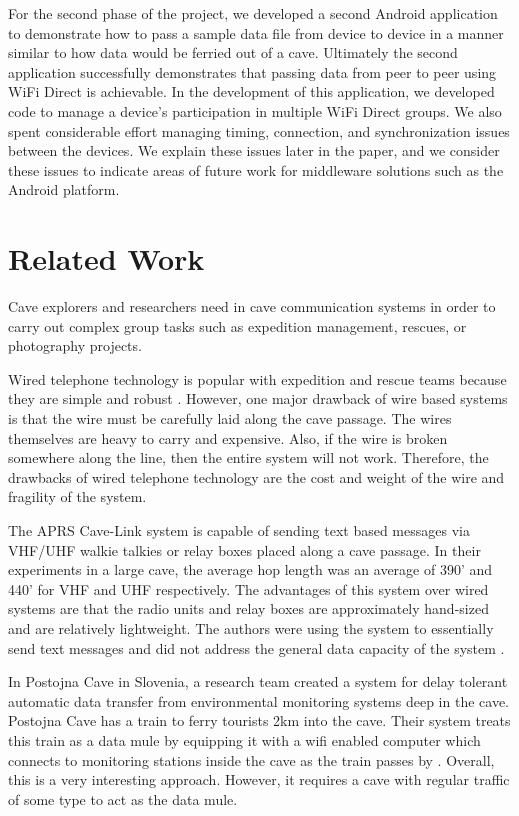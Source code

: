 \documentclass[10pt,twocolumn]{article}
\begin{document}
For the second phase of the project, we developed a second Android application to demonstrate how to pass a sample data file from device to device in a manner similar to how data would be ferried out of a cave.
Ultimately the second application successfully demonstrates that passing data from peer to peer using WiFi Direct is achievable. 
In the development of this application, we developed code to manage a device's participation in multiple WiFi Direct groups.
We also spent considerable effort managing timing, connection, and synchronization issues between the devices.
We explain these issues later in the paper, and we consider these issues to indicate areas of future work for middleware solutions
such as the Android platform.



\section{Related Work}
\label{sec:Related}
Cave explorers and researchers need in cave communication systems in order to carry out complex group tasks such as expedition management, rescues, or photography projects.

Wired telephone technology is popular with expedition and rescue teams because they are simple and robust \cite{cavecomm}.
However, one major drawback of wire based systems is that the wire must be carefully laid along the cave passage. 
The wires themselves are heavy to carry and expensive.
Also, if the wire is broken somewhere along the line, then the entire system will not work.
Therefore, the drawbacks of wired telephone technology are the cost and weight of the wire and fragility of the system.

The APRS Cave-Link system is capable of sending text based messages via VHF/UHF walkie talkies or relay boxes placed along a cave passage.
In their experiments in a large cave, the average hop length was an average of 390' and 440' for VHF and UHF respectively.
The advantages of this system over wired systems are that the radio units and relay boxes are approximately hand-sized and are relatively lightweight.
The authors were using the system to essentially send text messages and did not address the general data capacity of the system \cite{cavelink}.

In Postojna Cave in Slovenia, a research team created a system for delay tolerant automatic data transfer from environmental monitoring systems deep in the cave.
Postojna Cave has a train to ferry tourists 2km into the cave.
Their system treats this train as a data mule by equipping it with a wifi enabled computer which connects to monitoring stations inside the cave as the train passes by \cite{postojna2014}.
Overall, this is a very interesting approach. 
However, it requires a cave with regular traffic of some type to act as the data mule.
\end{document}
